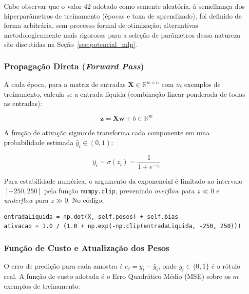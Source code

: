Cabe observar que o valor $42$ adotado como semente aleatória, à semelhança dos hiperparâmetros de treinamento (épocas e taxa de aprendizado), foi definido de forma arbitrária, sem processo formal de otimização; alternativas metodologicamente mais rigorosas para a seleção de parâmetros dessa natureza são discutidas na Seção~\ref{sec:potencial_mlp}.

\subsubsection{Propagação Direta (\textit{Forward Pass})}

A cada época, para a matriz de entradas $\mathbf{X} \in \mathbb{R}^{m \times n}$ com $m$ exemplos de treinamento, calcula-se a entrada líquida (combinação linear ponderada de todas as entradas):

\begin{equation}
\mathbf{z} = \mathbf{X}\mathbf{w} + b \in \mathbb{R}^m
\label{eq:adaline_z}
\end{equation}

A função de ativação sigmoide transforma cada componente em uma probabilidade estimada $\hat{y}_i \in (0,1)$:

\begin{equation}
\hat{y}_i = \sigma(z_i) = \frac{1}{1 + e^{-z_i}}
\label{eq:adaline_sigmoid}
\end{equation}

Para estabilidade numérica, o argumento da exponencial é limitado ao intervalo $[-250, 250]$ pela função \texttt{numpy.clip}, prevenindo \textit{overflow} para $z \ll 0$ e \textit{underflow} para $z \gg 0$. No código:

\begin{lstlisting}[caption={Propagação direta do ADALINE Logístico.}, label={lst:adaline_forward}]
entradaLiquida = np.dot(X, self.pesos) + self.bias
ativacao = 1.0 / (1.0 + np.exp(-np.clip(entradaLiquida, -250, 250)))
\end{lstlisting}

\subsubsection{Função de Custo e Atualização dos Pesos}

O erro de predição para cada amostra é $e_i = y_i - \hat{y}_i$, onde $y_i \in \{0, 1\}$ é o rótulo real. A função de custo adotada é o Erro Quadrático Médio (MSE) sobre os $m$ exemplos de treinamento:

